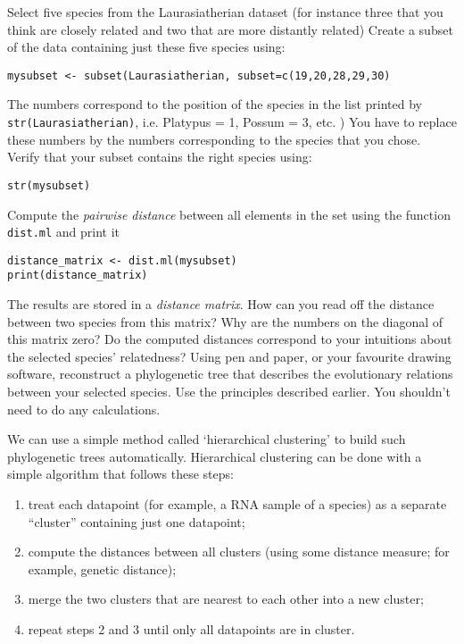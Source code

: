 \documentclass[a4paper, 9pt]{article}
\begin{document}
\begin{exercise}
    \action Select five species from the Laurasiatherian dataset (for instance three that you think are closely related and two that are more distantly related)
    \action Create a subset of the data containing just these five species using:\begin{lstlisting}
mysubset <- subset(Laurasiatherian, subset=c(19,20,28,29,30)
\end{lstlisting}
    The numbers correspond to the position of the species in the list printed by \texttt{str(Laurasiatherian)}, i.e. Platypus = 1, Possum = 3, etc. )
    You have to replace these numbers by the numbers corresponding to the species that you chose. 
    \action Verify that your subset contains the right species using:
\begin{lstlisting}
str(mysubset) 
\end{lstlisting}
    \action Compute the \textit{pairwise distance} between all elements in the set using the function \verb|dist.ml| and print it\begin{lstlisting}
distance_matrix <- dist.ml(mysubset)
print(distance_matrix)\end{lstlisting}
    \ask The results are stored in a \textit{distance matrix}. How can you read off the distance between two species from this matrix?
    \ask Why are the numbers on the diagonal of this matrix zero?
    \ask Do the computed distances correspond to your intuitions about the selected species' relatedness?
    \ask Using pen and paper, or your favourite drawing software, reconstruct a phylogenetic tree that describes the evolutionary relations between your selected species. Use the principles described earlier. You shouldn't need to do any calculations. 
\end{exercise}

We can use a simple method called `hierarchical clustering' to build
such phylogenetic trees automatically. Hierarchical clustering can be
done with a simple algorithm that follows these steps:

\begin{enumerate}
\item treat each datapoint (for example, a RNA sample of a species) as a separate ``cluster'' containing just one datapoint;
\item compute the distances between all clusters (using some distance measure; for example, genetic distance);
\item merge the two clusters that are nearest to each other into a new cluster;
\item repeat steps 2 and 3 until only all datapoints are in cluster. 
\end{enumerate}
\end{document}
